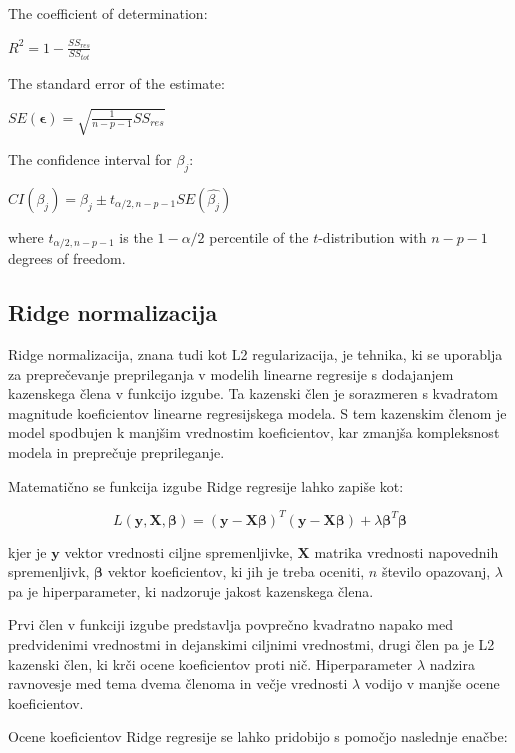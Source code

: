 \documentclass[a4paper,12pt,openright]{book}
\begin{document}
The coefficient of determination:

$R^2 = 1 - \frac{SS_{res}}{SS_{tot}}$

The standard error of the estimate:

$SE(\boldsymbol{\epsilon}) = \sqrt{\frac{1}{n-p-1} SS_{res}}$

The confidence interval for $\beta_j$:

$CI(\beta_j) = \beta_j \pm t_{\alpha/2,n-p-1}SE(\hat{\beta_j})$

where $t_{\alpha/2,n-p-1}$ is the $1 - \alpha/2$ percentile of the $t$-distribution with $n-p-1$ degrees of freedom.



\subsection{Ridge normalizacija}

Ridge normalizacija, znana tudi kot L2 regularizacija, je tehnika, ki se uporablja za preprečevanje preprileganja v modelih linearne regresije s dodajanjem kazenskega člena v funkcijo izgube. Ta kazenski člen je sorazmeren s kvadratom magnitude koeficientov linearne regresijskega modela. S tem kazenskim členom je model spodbujen k manjšim vrednostim koeficientov, kar zmanjša kompleksnost modela in preprečuje preprileganje.

Matematično se funkcija izgube Ridge regresije lahko zapiše kot:

\begin{equation*}
L(\mathbf{y}, \mathbf{X}, \boldsymbol{\beta}) = (\mathbf{y} - \mathbf{X} \boldsymbol{\beta})^T (\mathbf{y} - \mathbf{X} \boldsymbol{\beta}) + \lambda \boldsymbol{\beta}^T \boldsymbol{\beta}
\end{equation*}

kjer je $\mathbf{y}$ vektor vrednosti ciljne spremenljivke, $\mathbf{X}$ matrika vrednosti napovednih spremenljivk, $\boldsymbol{\beta}$ vektor koeficientov, ki jih je treba oceniti, $n$ število opazovanj, $\lambda$ pa je hiperparameter, ki nadzoruje jakost kazenskega člena.

Prvi člen v funkciji izgube predstavlja povprečno kvadratno napako med predvidenimi vrednostmi in dejanskimi ciljnimi vrednostmi, drugi člen pa je L2 kazenski člen, ki krči ocene koeficientov proti nič. Hiperparameter $\lambda$ nadzira ravnovesje med tema dvema členoma in večje vrednosti $\lambda$ vodijo v manjše ocene koeficientov.

Ocene koeficientov Ridge regresije se lahko pridobijo s pomočjo naslednje enačbe:
\end{document}
